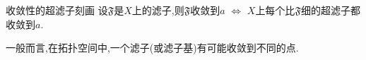\begin{proposition}{收敛性的超滤子刻画}{}
	设$\mathfrak{F}$是$X$上的滤子,则$\mathfrak{F}$收敛到$a$ $\iff$ $X$上每个比$\mathfrak{F}$细的超滤子都收敛到$a$.
\end{proposition}

\begin{remark}{}{}
	一般而言,在拓扑空间中,一个滤子(或滤子基)有可能收敛到不同的点.
\end{remark}











































































